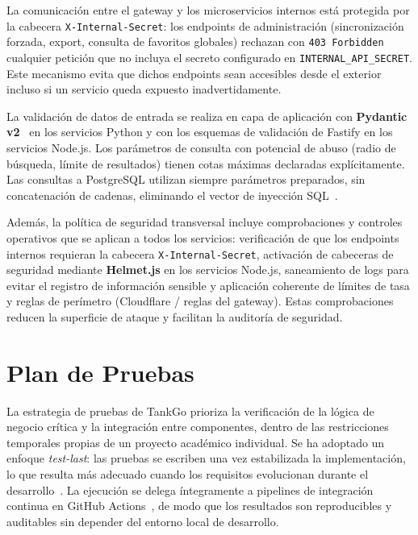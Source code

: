 La comunicación entre el gateway y los microservicios internos está protegida por la
cabecera \texttt{X-Internal-Secret}: los endpoints de administración (sincronización
forzada, export, consulta de favoritos globales) rechazan con \texttt{403 Forbidden}
cualquier petición que no incluya el secreto configurado en \texttt{INTERNAL\_API\_SECRET}.
Este mecanismo evita que dichos endpoints sean accesibles desde el exterior incluso si
un servicio queda expuesto inadvertidamente.

La validación de datos de entrada se realiza en capa de aplicación con
\textbf{Pydantic v2}~\cite{pydantic} en los servicios Python y con los esquemas de
validación de Fastify en los servicios Node.js. Los parámetros de consulta con potencial
de abuso (radio de búsqueda, límite de resultados) tienen cotas máximas declaradas
explícitamente. Las consultas a PostgreSQL utilizan siempre parámetros preparados, sin
concatenación de cadenas, eliminando el vector de inyección SQL~\cite{owasp_sqli}.

Además, la política de seguridad transversal incluye comprobaciones y controles operativos
que se aplican a todos los servicios: verificación de que los endpoints internos requieran
la cabecera \texttt{X-Internal-Secret}, activación de cabeceras de seguridad mediante
\textbf{Helmet.js} en los servicios Node.js, saneamiento de logs para evitar el registro
de información sensible y aplicación coherente de límites de tasa y reglas de perímetro
(Cloudflare / reglas del gateway). Estas comprobaciones reducen la superficie de ataque
y facilitan la auditoría de seguridad.

\section{Plan de Pruebas}
\label{sec:plan-pruebas}

La estrategia de pruebas de TankGo prioriza la verificación de la lógica de negocio crítica y
la integración entre componentes, dentro de las restricciones temporales propias de un proyecto
académico individual. Se ha adoptado un enfoque \textit{test-last}: las pruebas se escriben
una vez estabilizada la implementación, lo que resulta más adecuado cuando los requisitos
evolucionan durante el desarrollo~\cite{sommerville2011}. La ejecución se delega íntegramente a pipelines
de integración continua en GitHub
Actions~\cite{github_actions}, de modo que los resultados son reproducibles y auditables
sin depender del entorno local de desarrollo.

